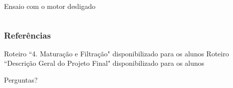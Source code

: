 \documentclass{beamer}
\begin{document}
\begin{frame}
\begin{columns}
\begin{column}{0.5\textwidth}
\begin{block}{Ensaio com o motor desligado}
		
		\begin{center}
		\end{center}
	\end{block}
	\end{column}
\end{columns}
\end{frame}

\begin{frame}
\frametitle{Referências}
\footnotesize{
\begin{thebibliography}{99} %
 Roteiro ``4. Maturação e Filtração" disponibilizado para os alunos
 Roteiro ``Descrição Geral do Projeto Final" disponibilizado para os alunos
\end{thebibliography}
}
\end{frame}


\begin{frame}
\Huge{\centerline{Perguntas?}}
\end{frame}

\end{document}
